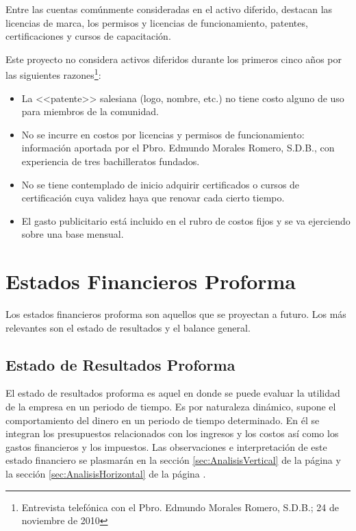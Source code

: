 Entre las cuentas comúnmente consideradas en el activo diferido, destacan las licencias de marca, los permisos y licencias de funcionamiento, patentes, certificaciones y cursos de capacitación.

Este proyecto no considera activos diferidos durante los primeros cinco años por las siguientes razones\footnote{Entrevista telefónica con el Pbro. Edmundo Morales Romero, S.D.B.; 24 de noviembre de 2010}:

\begin{itemize}
	\item La <<patente>> salesiana (logo, nombre, etc.) no tiene costo alguno de uso para miembros de la comunidad.
	\item No se incurre en costos por licencias y permisos de funcionamiento: información aportada por el Pbro. Edmundo Morales Romero, S.D.B., con experiencia de tres bachilleratos fundados.
	\item No se tiene contemplado de inicio adquirir certificados o cursos de certificación cuya validez haya que renovar cada cierto tiempo.
	\item El gasto publicitario está incluido en el rubro de costos fijos y se va ejerciendo sobre una base mensual.
\end{itemize}

\section{Estados Financieros Proforma}

Los estados financieros proforma son aquellos que se proyectan a futuro. Los más relevantes son el estado de resultados y el balance general.

\subsection{Estado de Resultados Proforma}

El estado de resultados proforma es aquel en donde se puede evaluar la utilidad de la empresa en un periodo de tiempo. Es por naturaleza dinámico, supone el comportamiento del dinero en un periodo de tiempo determinado. En él se integran los presupuestos relacionados con los ingresos y los costos así como los gastos financieros y los impuestos. Las observaciones e interpretación de este estado financiero se plasmarán en la sección \ref{sec:AnalisisVertical} de la página \pageref{sec:AnalisisVertical} y la sección \ref{sec:AnalisisHorizontal} de la página \pageref{sec:AnalisisHorizontal}.

